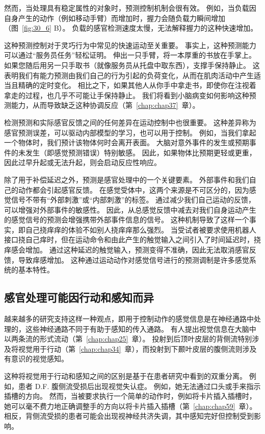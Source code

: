 然而，当处理具有稳定属性的对象时，预测控制机制会很有效。
例如，当负载因自身产生的动作（例如移动手臂）而增加时，握力会随负载力瞬间增加（图~\ref{fig:30_6} B）。
负载的感官检测速度太慢，无法解释握力的这种快速增加。


这种预测控制对于灵巧行为中常见的快速运动至关重要。 事实上，这种预测能力可以通过“服务员任务”轻松证明。 
伸出一只手臂，将一本厚重的书放在手掌上。
如果您随后用另一只手取书（就像服务员从托盘中取东西），支撑手保持静止。
这表明我们有能力预测由我们自己的行为引起的负荷变化，从而在肌肉活动中产生适当且精确的定时变化。
相比之下，如果其他人从你手中拿走书，即使你在注视着拿走的过程，也几乎不可能让手保持静止。
我们将看到小脑病变如何影响这种预测能力，从而导致缺乏这种协调反应（第~\ref{chap:chap37}~章）。


检测预测和实际感官反馈之间的任何差异在运动控制中也很重要。
这种差异称为感官预测误差，可以驱动内部模型的学习，也可以用于控制。
例如，当我们拿起一个物体时，我们预计该物体何时会离开表面。
大脑对意外事件的发生或预期事件的未发生（即感觉预测错误）特别敏感。
因此，如果物体比预期更轻或更重，因此过早升起或无法升起，则会启动反应性响应。


除了用于补偿延迟之外，预测是感官处理中的一个关键要素。
外部事件和我们自己的动作都会引起感官反馈。
在感觉受体中，这两个来源是不可区分的，因为感觉信号不带有“外部刺激”或“内部刺激”的标签。
通过减少我们自己运动的反馈，可以增强对外部事件的敏感性。
因此，从总感觉反馈中减去对我们自身运动产生的感觉信号的预测会增强携带外部事件信息的信号。
这种机制导致了这样一个事实，即自己挠痒痒的体验不如别人挠痒痒那么强烈。
当受试者被要求使用机器人接口挠自己痒时，但在运动命令和由此产生的触觉输入之间引入了时间延迟时，挠痒感会增加。
通过这种延迟的触觉输入，预测变得不准确，因此无法取消感官反馈，导致痒感增加。
这种通过运动动作对感觉信号进行的预测调制是许多感觉系统的基本特性。



\subsection{感官处理可能因行动和感知而异}

越来越多的研究支持这样一种观点，即用于控制动作的感觉信息是在神经通路中处理的，这些神经通路不同于有助于感知的传入通路。
有人提出视觉信息在大脑中以两条流的形式流动（第~\ref{chap:chap25}~章）。
投射到后顶叶皮层的背侧流特别涉及将视觉用于行动（第~\ref{chap:chap34}~章），而投射到下颞叶皮层的腹侧流则涉及有意识的视觉感知。


这种将视觉用于行动和感知之间的区别是基于在患者研究中看到的双重分离。
例如，患者 D.F. 腹侧流受损后出现视觉失认症。
例如，她无法通过口头或手来指示插槽的方向。
然而，当被要求执行一个简单的动作时，例如将卡片插入插槽时，她可以毫不费力地正确调整手的方向以将卡片插入插槽（第~\ref{chap:chap59}~章）。
相反，背侧流受损的患者可能会出现视神经共济失调，其中感知完好但控制受到影响。


